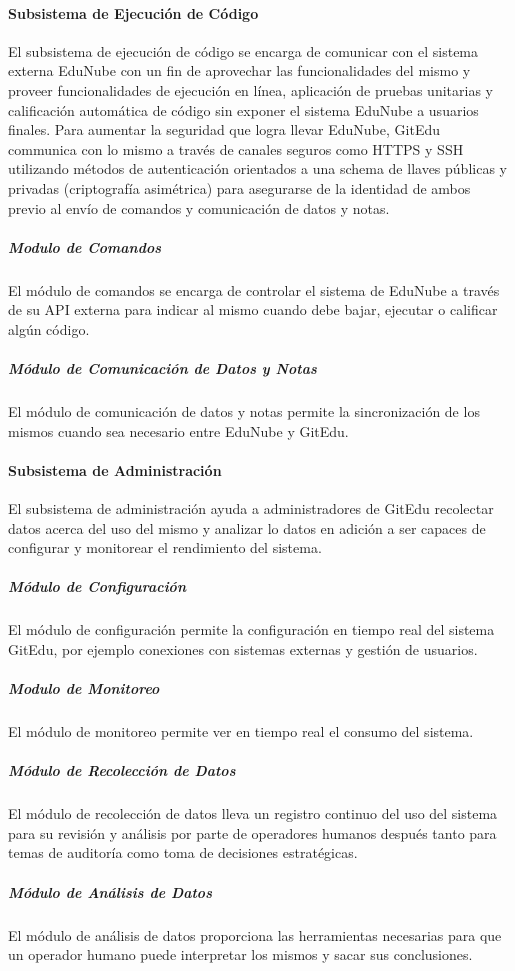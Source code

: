 \paragraph{Subsistema de Ejecución de Código}
El subsistema de ejecución de código se encarga de comunicar con el sistema externa EduNube con un fin de aprovechar las funcionalidades del mismo y proveer funcionalidades de ejecución en línea, aplicación de pruebas unitarias y calificación automática de código sin exponer el sistema EduNube a usuarios finales. Para aumentar la seguridad que logra llevar EduNube, GitEdu communica con lo mismo a través de canales seguros como HTTPS y SSH utilizando métodos de autenticación orientados a una schema de llaves públicas y privadas (criptografía asimétrica) para asegurarse de la identidad de ambos previo al envío de comandos y comunicación de datos y notas.

\subparagraph{Modulo de Comandos}
El módulo de comandos se encarga de controlar el sistema de EduNube a través de su API externa para indicar al mismo cuando debe bajar, ejecutar o calificar algún código.

\subparagraph{Módulo de Comunicación de Datos y Notas}
El módulo de comunicación de datos y notas permite la sincronización de los mismos cuando sea necesario entre EduNube y GitEdu.

\paragraph{Subsistema de Administración}
El subsistema de administración ayuda a administradores de GitEdu recolectar datos acerca del uso del mismo y analizar lo datos en adición a ser capaces de configurar y monitorear el rendimiento del sistema.

\subparagraph{Módulo de Configuración}
El módulo de configuración permite la configuración en tiempo real del sistema GitEdu, por ejemplo conexiones con sistemas externas y gestión de usuarios.

\subparagraph{Modulo de Monitoreo}
El módulo de monitoreo permite ver en tiempo real el consumo del sistema.

\subparagraph{Módulo de Recolección de Datos}
El módulo de recolección de datos lleva un registro continuo del uso del sistema para su revisión y análisis por parte de operadores humanos después tanto para temas de auditoría como toma de decisiones estratégicas.

\subparagraph{Módulo de Análisis de Datos}
El módulo de análisis de datos proporciona las herramientas necesarias para que un operador humano puede interpretar los mismos y sacar sus conclusiones.

